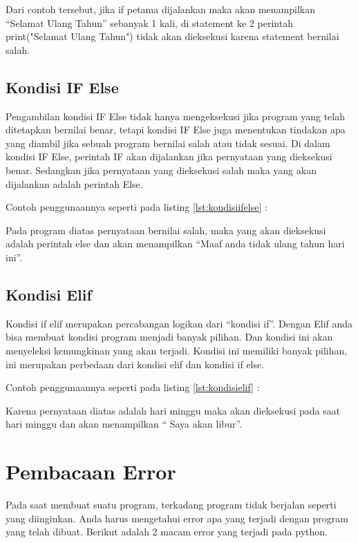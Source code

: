 Dari contoh tersebut, jika if petama dijalankan maka akan menampilkan “Selamat Ulang Tahun” sebanyak 1 kali, di statement ke 2 perintah print("Selamat Ulang Tahun") tidak akan dieksekusi karena statement bernilai salah.

\subsection{Kondisi IF Else}
Pengambilan kondisi IF Else tidak hanya mengeksekusi jika program yang telah ditetapkan bernilai benar, tetapi kondisi IF Else juga menentukan tindakan apa yang diambil jika sebuah program bernilai salah atau tidak sesuai.
Di dalam kondisi IF Else, perintah IF akan dijalankan jika pernyataan yang dieksekusi benar. Sedangkan jika pernyataan yang dieksekusi salah maka yang akan dijalankan adalah perintah Else.

Contoh penggunaannya seperti pada listing \ref{lst:kondisiifelse} :


Pada program diatas pernyataan bernilai salah, maka yang akan dieksekusi adalah perintah else dan akan menampilkan “Maaf anda tidak ulang tahun hari ini”.

\subsection{Kondisi Elif}
Kondisi if elif merupakan percabangan logikan dari “kondisi if”. Dengan Elif anda bisa membuat kondisi program menjadi banyak pilihan. Dan kondisi ini akan menyeleksi kemungkinan yang akan terjadi. Kondisi ini memiliki banyak pilihan, ini merupakan perbedaan dari kondisi elif dan kondisi if else.

Contoh penggunaannya seperti pada listing \ref{lst:kondisielif} :


Karena pernyataan diatas adalah hari minggu maka akan dieksekusi pada saat hari minggu dan akan menampilkan “ Saya akan libur”.

\section{Pembacaan Error}
Pada saat membuat suatu program, terkadang program tidak berjalan seperti yang  diinginkan. Anda harus mengetahui error apa yang terjadi dengan program yang telah dibuat. Berikut adalah 2 macam error yang terjadi pada python.
